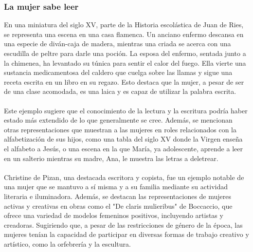 \documentclass{report}
\begin{document}
\subsubsection{La mujer sabe leer}
En una miniatura del siglo XV, parte de la Historia escolástica de Juan de Ries, se representa una escena en una casa flamenca. Un anciano enfermo descansa en una especie de diván-caja de madera, mientras una criada se acerca con una escudilla de peltre para darle una poción. La esposa del enfermo, sentada junto a la chimenea, ha levantado su túnica para sentir el calor del fuego. Ella vierte una sustancia medicamentosa del caldero que cuelga sobre las llamas y sigue una receta escrita en un libro en su regazo. Esto destaca que la mujer, a pesar de ser de una clase acomodada, es una laica y es capaz de utilizar la palabra escrita. 
\\\\
Este ejemplo sugiere que el conocimiento de la lectura y la escritura podría haber estado más extendido de lo que generalmente se cree. Además, se mencionan otras representaciones que muestran a las mujeres en roles relacionados con la alfabetización de sus hijos, como una tabla del siglo XV donde la Virgen enseña el alfabeto a Jesús, o una escena en la que María, ya adolescente, aprende a leer en un salterio mientras su madre, Ana, le muestra las letras a deletrear.
\\\\
Christine de Pizan, una destacada escritora y copista, fue un ejemplo notable de una mujer que se mantuvo a sí misma y a su familia mediante su actividad literaria e iluminadora. Además, se destacan las representaciones de mujeres activas y creativas en obras como el "De claris mulieribus" de Boccaccio, que ofrece una variedad de modelos femeninos positivos, incluyendo artistas y creadoras. Sugiriendo que, a pesar de las restricciones de género de la época, las mujeres tenían la capacidad de participar en diversas formas de trabajo creativo y artístico, como la orfebrería y la escultura.
\end{document}

